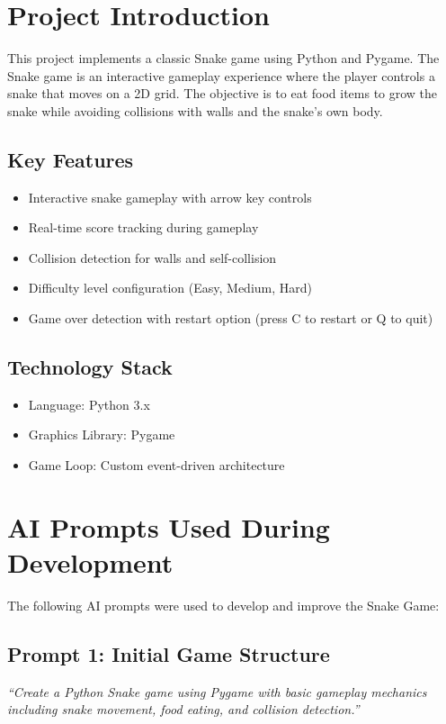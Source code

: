 \documentclass[12pt,a4paper]{article}
\author{Game Development Report}
\date{\today}
\begin{document}
\maketitle

\section{Project Introduction}

This project implements a classic Snake game using Python and Pygame. The Snake game is an interactive gameplay experience where the player controls a snake that moves on a 2D grid. The objective is to eat food items to grow the snake while avoiding collisions with walls and the snake's own body.

\subsection{Key Features}
\begin{itemize}
    \item Interactive snake gameplay with arrow key controls
    \item Real-time score tracking during gameplay
    \item Collision detection for walls and self-collision
    \item Difficulty level configuration (Easy, Medium, Hard)
    \item Game over detection with restart option (press C to restart or Q to quit)
\end{itemize}

\subsection{Technology Stack}
\begin{itemize}
    \item Language: Python 3.x
    \item Graphics Library: Pygame
    \item Game Loop: Custom event-driven architecture
\end{itemize}

\section{AI Prompts Used During Development}

The following AI prompts were used to develop and improve the Snake Game:

\subsection{Prompt 1: Initial Game Structure}
\textit{``Create a Python Snake game using Pygame with basic gameplay mechanics including snake movement, food eating, and collision detection.''}
\end{document}
